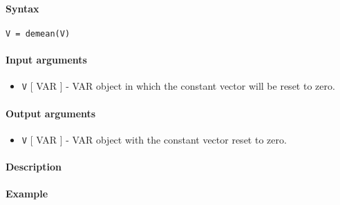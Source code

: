 


	\paragraph{Syntax}

\begin{verbatim}
V = demean(V)
\end{verbatim}

\paragraph{Input arguments}

\begin{itemize}
\itemsep1pt\parskip0pt
\item
  \texttt{V} {[} VAR {]} - VAR object in which the constant vector will
  be reset to zero.
\end{itemize}

\paragraph{Output arguments}

\begin{itemize}
\itemsep1pt\parskip0pt
\item
  \texttt{V} {[} VAR {]} - VAR object with the constant vector reset to
  zero.
\end{itemize}

\paragraph{Description}

\paragraph{Example}


